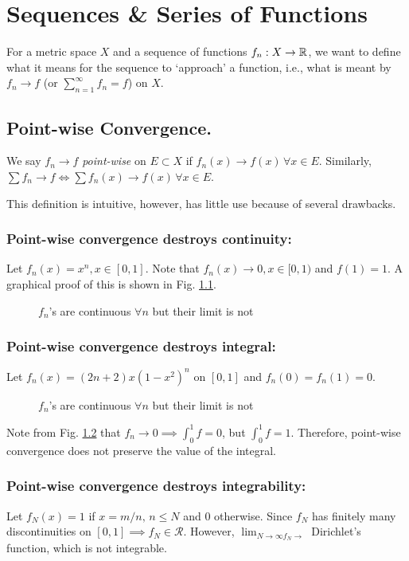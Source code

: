 \chapter{Sequences \& Series of Functions}
For a metric space $X$ and a sequence of functions $f_n:X\to\mathbb{R}$, we want to define what it means for the sequence to `approach' a function, i.e., what is meant by $f_n\to f$ (or $\sum^\infty_{n=1}f_n=f$) on $X$.

\section{Point-wise Convergence.}
We say $f_n\to f$ \emph{point-wise} on $E\subset X$ if $f_n(x)\to f(x)\,\forall x\in E$.
Similarly, $\sum f_n\to f\iff \sum f_n(x)\to f(x)\,\forall x\in E$.

This definition is intuitive, however, has little use because of several drawbacks.

\subsection{Point-wise convergence destroys continuity:}
Let $f_n(x)=x^n,x\in[0,1]$.
Note that $f_n(x)\to 0,x\in[0,1)$ and $f(1) = 1$.
A graphical proof of this is shown in Fig. \ref{fig:ptwiseCont}.
\begin{figure}[!ht]
    \centering
    \scalebox{0.6}{}
    \caption{$f_n$'s are continuous $\forall n$ but their limit is not}
    \label{fig:ptwiseCont}
\end{figure}

\subsection{Point-wise convergence destroys integral:}
Let $f_n(x)=(2n+2)x(1-x^2)^n$ on $[0,1]$ and $f_n(0)=f_n(1)=0$.
\vspace{-1.5in}
\begin{figure}[!ht]
    \centering
    \scalebox{0.6}{}
    \caption{$f_n$'s are continuous $\forall n$ but their limit is not}
    \label{fig:ptwiseInt}
\end{figure}

Note from Fig. \ref{fig:ptwiseInt} that $f_n\to 0\implies \int^1_0 f = 0$, but $\int^1_0 f=1$.
Therefore, point-wise convergence does not preserve the value of the integral.

\subsection{Point-wise convergence destroys integrability:}
Let $f_N(x)=1$ if $x=m/n,\,n\leq N$ and $0$ otherwise.
Since $f_N$ has finitely many discontinuities on $[0,1]\implies f_N\in\mathcal{R}$.
However, $\lim_{N\to\infty f_N\to}$ Dirichlet's function, which is not integrable.

